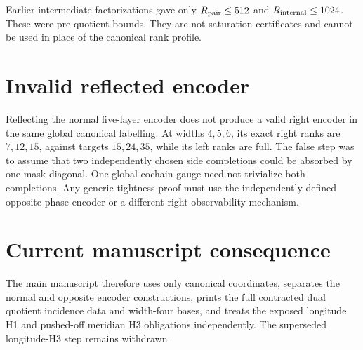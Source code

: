 \documentclass[11pt]{article}
\begin{document}
Earlier intermediate factorizations gave only
\(R_{\rm pair}\le512\) and \(R_{\rm internal}\le1024\).  These were
pre-quotient bounds.  They are not saturation certificates and cannot be
used in place of the canonical rank profile.

\section{Invalid reflected encoder}

Reflecting the normal five-layer encoder does not produce a valid right
encoder in the same global canonical labelling.  At widths \(4,5,6\), its
exact right ranks are \(7,12,15\), against targets \(15,24,35\), while its
left ranks are full.  The false step was to assume that two independently
chosen side completions could be absorbed by one mask diagonal.  One global
cochain gauge need not trivialize both completions.  Any generic-tightness
proof must use the independently defined opposite-phase encoder or a
different right-observability mechanism.

\section{Current manuscript consequence}

The main manuscript therefore uses only canonical coordinates, separates
the normal and opposite encoder constructions, prints the full contracted
dual quotient incidence data and width-four bases, and treats the exposed
longitude H1 and pushed-off meridian H3 obligations independently.  The
superseded longitude-H3 step remains withdrawn.
\end{document}
